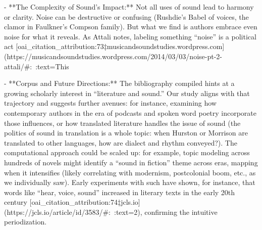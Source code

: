 \documentclass[12pt]{report}
\begin{document}
- **The Complexity of Sound’s Impact:** Not all uses of sound lead to harmony or clarity. Noise can be destructive or confusing (Rushdie’s Babel of voices, the clamor in Faulkner’s Compson family). But what we find is authors embrace even noise for what it reveals. As Attali notes, labeling something “noise” is a political act [oai_citation_attribution:73‡musicandsoundstudies.wordpress.com](https://musicandsoundstudies.wordpress.com/2014/03/03/noise-pt-2-attali/#:~:text=This%

- **Corpus and Future Directions:** The bibliography compiled hints at a growing scholarly interest in “literature and sound.” Our study aligns with that trajectory and suggests further avenues: for instance, examining how contemporary authors in the era of podcasts and spoken word poetry incorporate those influences, or how translated literature handles the issue of sound (the politics of sound in translation is a whole topic: when Hurston or Morrison are translated to other languages, how are dialect and rhythm conveyed?). The computational approach could be scaled up: for example, topic modeling across hundreds of novels might identify a “sound in fiction” theme across eras, mapping when it intensifies (likely correlating with modernism, postcolonial boom, etc., as we individually saw). Early experiments with such have shown, for instance, that words like “hear, voice, sound” increased in literary texts in the early 20th century [oai_citation_attribution:74‡jcls.io](https://jcls.io/article/id/3583/#:~:text=2), confirming the intuitive periodization.
\end{document}
